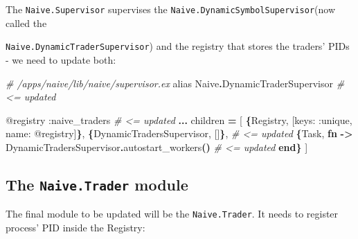 \documentclass[
  oneside]{book}
\newenvironment{Shaded}{\begin{snugshade}}{\end{snugshade}}
\newcommand{\CommentTok}[1]{\textcolor[rgb]{0.56,0.35,0.01}{\textit{#1}}}
\newcommand{\ConstantTok}[1]{\textcolor[rgb]{0.56,0.35,0.01}{#1}}
\newcommand{\FunctionTok}[1]{\textcolor[rgb]{0.13,0.29,0.53}{\textbf{#1}}}
\newcommand{\ImportTok}[1]{#1}
\newcommand{\KeywordTok}[1]{\textcolor[rgb]{0.13,0.29,0.53}{\textbf{#1}}}
\newcommand{\NormalTok}[1]{#1}
\newcommand{\OperatorTok}[1]{\textcolor[rgb]{0.81,0.36,0.00}{\textbf{#1}}}
\newcommand{\OtherTok}[1]{\textcolor[rgb]{0.56,0.35,0.01}{#1}}
\newcommand{\VariableTok}[1]{\textcolor[rgb]{0.00,0.00,0.00}{#1}}
\begin{document}
The \texttt{Naive.Supervisor} supervises the \texttt{Naive.DynamicSymbolSupervisor}(now called the

\texttt{Naive.DynamicTraderSupervisor}) and the registry that stores the traders' PIDs - we need to update both:

\begin{Shaded}
\begin{Highlighting}[]
  \CommentTok{\# /apps/naive/lib/naive/supervisor.ex}
  \ImportTok{alias} \ConstantTok{Naive}\OperatorTok{.}\ConstantTok{DynamicTraderSupervisor} \CommentTok{\# \textless{}= updated}

  \OtherTok{@registry} \VariableTok{:naive\_traders} \CommentTok{\# \textless{}= updated}
  \OperatorTok{...}
\NormalTok{    children }\OperatorTok{=} \OtherTok{[}
      \FunctionTok{\{}\ConstantTok{Registry}\NormalTok{, }\OtherTok{[}\VariableTok{keys:} \VariableTok{:unique}\NormalTok{, }\VariableTok{name:} \OtherTok{@registry]}\FunctionTok{\}}\NormalTok{,}
      \FunctionTok{\{}\ConstantTok{DynamicTradersSupervisor}\NormalTok{, }\OtherTok{[]}\FunctionTok{\}}\NormalTok{, }\CommentTok{\# \textless{}= updated}
      \FunctionTok{\{}\ConstantTok{Task}\NormalTok{,}
       \KeywordTok{fn} \OperatorTok{{-}\textgreater{}}
         \ConstantTok{DynamicTradersSupervisor}\OperatorTok{.}\NormalTok{autostart\_workers}\FunctionTok{()} \CommentTok{\# \textless{}= updated}
       \KeywordTok{end}\FunctionTok{\}}
    \OtherTok{]}
\end{Highlighting}
\end{Shaded}

\subsection{\texorpdfstring{The \texttt{Naive.Trader} module}{The Naive.Trader module}}\label{the-naive.trader-module}

The final module to be updated will be the \texttt{Naive.Trader}. It needs to register process' PID inside the Registry:
\end{document}
